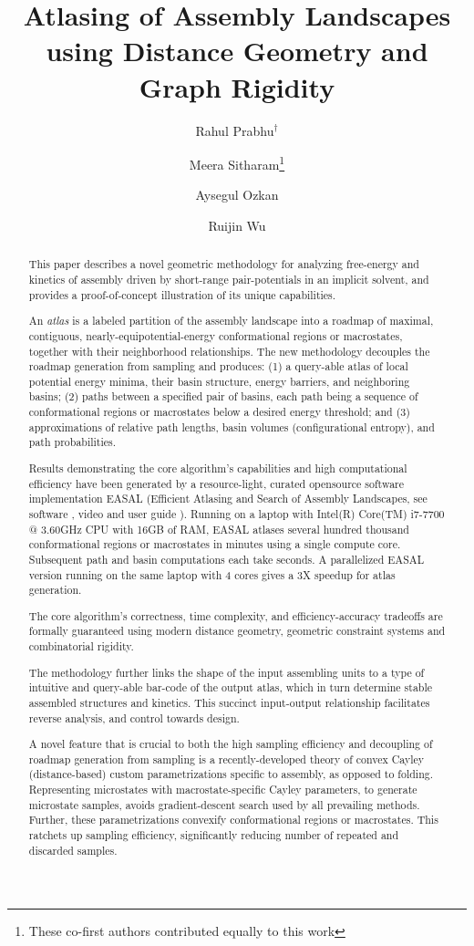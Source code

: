 \documentclass[]{article}
\author{Rahul Prabhu$^\dag$ \and Meera Sitharam\footnote{These co-first authors contributed equally to this work} \and Aysegul Ozkan \and Ruijin Wu}
\title{Atlasing of Assembly Landscapes using Distance Geometry and Graph Rigidity}
\begin{document}
\maketitle
\begin{abstract}
\scriptsize{
This paper describes a novel geometric methodology for analyzing free-energy
and kinetics of assembly driven by short-range pair-potentials in an implicit 
solvent, and provides a proof-of-concept illustration of its unique capabilities. 

An \emph{atlas} is a labeled partition of the assembly landscape into a
roadmap of maximal, contiguous, nearly-equipotential-energy
conformational regions or macrostates, together with their neighborhood
relationships. The new methodology decouples the roadmap generation
from sampling and produces: (1) a query-able atlas of local potential
energy minima, their basin structure, energy barriers, and neighboring
basins; (2) paths between a specified pair of basins, each path being a
sequence of conformational regions or macrostates below a desired energy threshold;
and (3) approximations of relative path lengths, basin volumes
(configurational entropy), and path probabilities.
 
Results demonstrating the core algorithm's capabilities and high computational
efficiency have been generated by a resource-light, curated opensource
software implementation EASAL \cite{Ozkan:toms} (Efficient Atlasing and
Search of Assembly Landscapes, see software \cite{easalSoftware}, video \cite{easalVideo}
and user guide \cite{easalUserGuide}). Running
on a laptop with Intel(R) Core(TM) i7-7700 @ 3.60GHz CPU with 16GB of
RAM, EASAL atlases several hundred thousand
conformational regions or macrostates in minutes using a single compute core.
Subsequent path and basin computations each take seconds. A
parallelized EASAL version running on the same laptop with 4 cores
gives a 3X speedup for atlas generation.

The core algorithm's correctness, time complexity, and
efficiency-accuracy tradeoffs are formally guaranteed using modern
distance geometry, geometric constraint systems and combinatorial rigidity. 

The methodology further links the shape of the input 
assembling units to a type of intuitive and query-able bar-code of the
output atlas, which in turn determine stable assembled structures and 
kinetics. This succinct input-output relationship facilitates reverse 
analysis, and control towards design.

A novel feature that is crucial to both the high sampling efficiency and
decoupling of roadmap generation from sampling is a recently-developed
theory of convex Cayley (distance-based) custom parametrizations specific
to assembly, as opposed to folding.  Representing microstates with
macrostate-specific Cayley parameters, to generate microstate samples,
avoids gradient-descent search used by all prevailing methods. 
Further, these parametrizations convexify conformational regions or macrostates. 
This ratchets up sampling efficiency, significantly reducing number of
repeated and discarded samples. 

}
\end{abstract}
\end{document}

